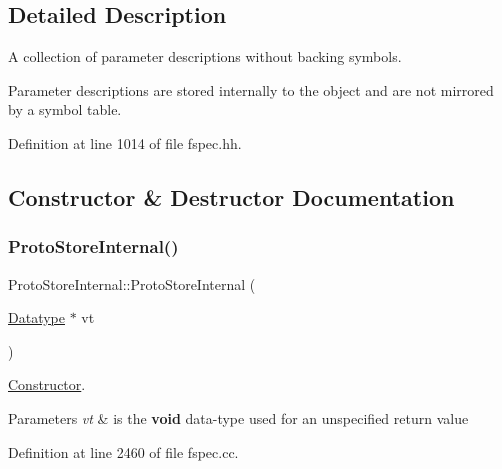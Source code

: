 \subsection{Detailed Description}
A collection of parameter descriptions without backing symbols. 

Parameter descriptions are stored internally to the object and are not mirrored by a symbol table. 

Definition at line 1014 of file fspec.\+hh.



\subsection{Constructor \& Destructor Documentation}
\mbox{\label{class_proto_store_internal_a16f69dbe9bc548f8bee41daa68c28ee5}} 
\subsubsection{\texorpdfstring{ProtoStoreInternal()}{ProtoStoreInternal()}}
{\footnotesize\ttfamily Proto\+Store\+Internal\+::\+Proto\+Store\+Internal (\begin{DoxyParamCaption}\item[{\mbox{\hyperlink{class_datatype}{Datatype}} $\ast$}]{vt }\end{DoxyParamCaption})}



\mbox{\hyperlink{class_constructor}{Constructor}}. 


\begin{DoxyParams}{Parameters}
{\em vt} & is the {\bfseries{void}} data-\/type used for an unspecified return value \\
\hline
\end{DoxyParams}


Definition at line 2460 of file fspec.\+cc.

